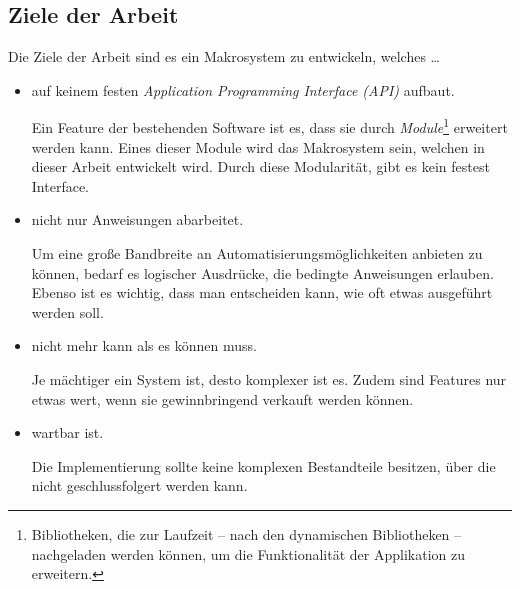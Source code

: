  \subsection{Ziele der Arbeit}
  \label{ssec:Ziele der Arbeit}
    Die Ziele der Arbeit sind es ein Makrosystem zu entwickeln, welches \ldots
    \begin{itemize}
      \item auf keinem festen \emph{Application Programming Interface (API)} aufbaut.

        Ein Feature der bestehenden Software ist es, dass sie durch \emph{Module}\footnote{
          Bibliotheken, die zur Laufzeit -- nach den dynamischen Bibliotheken --  nachgeladen werden können, um die Funktionalität der Applikation zu erweitern.
        } erweitert werden kann. Eines dieser Module wird das Makrosystem sein, welchen in dieser Arbeit entwickelt wird. Durch diese Modularität, gibt es kein festest Interface.

      \item nicht nur Anweisungen abarbeitet.

        Um eine große Bandbreite an Automatisierungsmöglichkeiten anbieten zu können, bedarf es logischer Ausdrücke, die bedingte Anweisungen erlauben. Ebenso ist es wichtig, dass man entscheiden kann, wie oft etwas ausgeführt werden soll.

      \item nicht mehr kann als es können muss.

        Je mächtiger ein System ist, desto komplexer ist es. Zudem sind Features nur etwas wert, wenn sie gewinnbringend verkauft werden können.

      \item wartbar ist.

        Die Implementierung sollte keine komplexen Bestandteile besitzen, über die nicht geschlussfolgert werden kann.
    \end{itemize}

